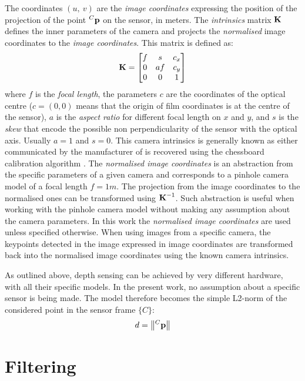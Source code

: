 The coordinates $(u, \:v)$ are the \emph{image coordinates} expressing the position of the projection of the point $^{C}\boldsymbol{\mathbf{p}}$ on the sensor, in meters. The \emph{intrinsics} matrix $\boldsymbol{\mathbf{K}}$ defines the inner parameters of the camera and projects the \emph{normalised} image coordinates to the \emph{image coordinates}. This matrix is defined as:
\begin{equation}
	\boldsymbol{\mathbf{K}} = \begin{bmatrix}
              f & s  & c_x\\ 
              0 & af & c_y\\ 
              0 & 0  & 1 
           \end{bmatrix} 
\end{equation}
where $f$ is the \emph{focal length}, the parameters $c$ are the coordinates of the optical centre ($c = (0,0)$ means that the origin of film coordinates is at the centre of the sensor), $a$ is the \emph{aspect ratio} for  different focal length on $x$ and $y$, and $s$ is the \emph{skew} that encode the possible non perpendicularity of the sensor with the optical axis. Usually $a = 1$ and $s = 0$. This camera intrinsics is generally known as either communicated by the manufacturer of is recovered using the chessboard calibration algorithm \cite{szeliski_computer_2011}.
The \emph{normalised image coordinates} is an abstraction from the specific parameters of a given camera and corresponds to a pinhole camera model of a focal length $f = 1m$. The projection from the image coordinates to the normalised ones can be transformed using $\boldsymbol{\mathbf{K}}^{-1}$. Such abstraction is useful when working with the pinhole camera model without making any assumption about the camera parameters. In this work the \emph{normalised image coordinates} are used unless specified otherwise. When using images from a specific camera, the keypoints detected in the image expressed in image coordinates are transformed back into the normalised image coordinates using the known camera intrinsics.

As outlined above, depth sensing can be achieved by very different hardware, with all their specific models. In the present work, no assumption about a specific sensor is being made. The model therefore becomes the simple L2-norm of the considered point in the sensor frame $\{ C \}$:
\begin{equation}
	d = \left \| {}^{C}\boldsymbol{\mathbf{p}} \right \|
\end{equation}


\section{Filtering}\label{C2:filters}

